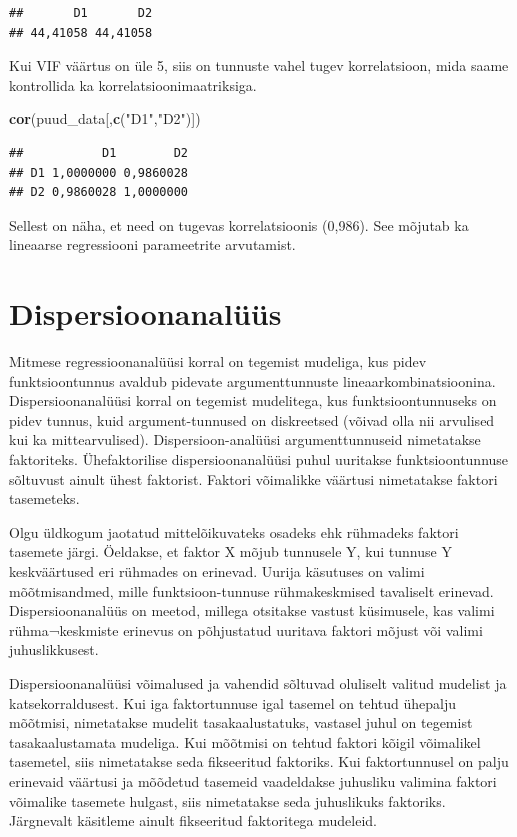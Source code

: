 \documentclass[
]{book}
\newenvironment{Shaded}{\begin{snugshade}}{\end{snugshade}}
\newcommand{\FunctionTok}[1]{\textcolor[rgb]{0.13,0.29,0.53}{\textbf{#1}}}
\newcommand{\NormalTok}[1]{#1}
\newcommand{\StringTok}[1]{\textcolor[rgb]{0.31,0.60,0.02}{#1}}
\renewenvironment{Shaded} {\begin{snugshade}\footnotesize} {\end{snugshade}}
\begin{document}
\begin{verbatim}
##       D1       D2 
## 44,41058 44,41058
\end{verbatim}

Kui VIF väärtus on üle 5, siis on tunnuste vahel tugev korrelatsioon, mida saame kontrollida ka korrelatsioonimaatriksiga.

\begin{Shaded}
\begin{Highlighting}[]
\FunctionTok{cor}\NormalTok{(puud\_data[,}\FunctionTok{c}\NormalTok{(}\StringTok{"D1"}\NormalTok{,}\StringTok{"D2"}\NormalTok{)])}
\end{Highlighting}
\end{Shaded}

\begin{verbatim}
##           D1        D2
## D1 1,0000000 0,9860028
## D2 0,9860028 1,0000000
\end{verbatim}

Sellest on näha, et need on tugevas korrelatsioonis (0,986). See mõjutab ka lineaarse regressiooni parameetrite arvutamist.

\section{Dispersioonanalüüs}\label{dispersioonanaluxfcuxfcs}

Mitmese regressioonanalüüsi korral on tegemist mudeliga, kus pidev funktsioontunnus avaldub pidevate argumenttunnuste lineaarkombinatsioonina. Dispersioonanalüüsi korral on tegemist mudelitega, kus funktsioontunnuseks on pidev tunnus, kuid argument-tunnused on diskreetsed (võivad olla nii arvulised kui ka mittearvulised). Dispersioon-analüüsi argumenttunnuseid nimetatakse faktoriteks. Ühefaktorilise dispersioonanalüüsi puhul uuritakse funktsioontunnuse sõltuvust ainult ühest faktorist. Faktori võimalikke väärtusi nimetatakse faktori tasemeteks.

Olgu üldkogum jaotatud mittelõikuvateks osadeks ehk rühmadeks faktori tasemete järgi. Öeldakse, et faktor X mõjub tunnusele Y, kui tunnuse Y keskväärtused eri rühmades on erinevad. Uurija käsutuses on valimi mõõtmisandmed, mille funktsioon-tunnuse rühmakeskmised tavaliselt erinevad. Dispersioonanalüüs on meetod, millega otsitakse vastust küsimusele, kas valimi rühma¬keskmiste erinevus on põhjustatud uuritava faktori mõjust või valimi juhuslikkusest.

Dispersioonanalüüsi võimalused ja vahendid sõltuvad oluliselt valitud mudelist ja katsekorraldusest. Kui iga faktortunnuse igal tasemel on tehtud ühepalju mõõtmisi, nimetatakse mudelit tasakaalustatuks, vastasel juhul on tegemist tasakaalustamata mudeliga. Kui mõõtmisi on tehtud faktori kõigil võimalikel tasemetel, siis nimetatakse seda fikseeritud faktoriks. Kui faktortunnusel on palju erinevaid väärtusi ja mõõdetud tasemeid vaadeldakse juhusliku valimina faktori võimalike tasemete hulgast, siis nimetatakse seda juhuslikuks faktoriks. Järgnevalt käsitleme ainult fikseeritud faktoritega mudeleid.
\end{document}
